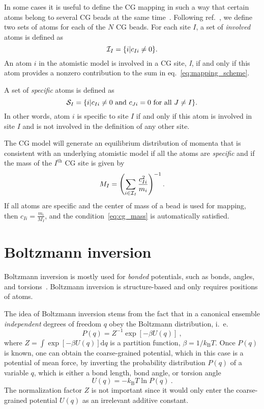 In some cases it is useful to define the CG mapping in such a way that certain atoms belong to several CG beads at the same time~\cite{Fritz:2009}. Following ref.~\cite{Noid:2008.1}, we define two sets of atoms for each of the $N$ CG beads. For each site $I$, a set of {\em involved} atoms is defined as
\begin{equation}
 {\cal I}_I=\{i|c_{Ii}\ne0\}.
\end{equation}
An atom $i$ in the atomistic model is involved in a CG site, \textit{I}, if and only if this atom provides a nonzero contribution to the sum in eq.~\ref{eq:mapping_scheme}.

A set of {\em specific} atoms is defined as
\begin{equation}
 {\cal S}_I=\{i|c_{Ii}\ne0 \text{ and } c_{Ji}=0 \text{ for all } J \ne I\}.
\end{equation}
In other words, atom $i$ is specific to site $I$ if and only if this atom is involved in site $I$ and is not involved in the definition of any other site.

The CG model will generate an equilibrium distribution of momenta that is consistent with an underlying atomistic model if all the atoms are {\em specific} and if the mass of the $I^\text{th}$ CG site is given by~\cite{Noid:2008.1}
\begin{equation}
M_I= \left( \sum_{i \in {\cal I}_I}\frac{c_{Ii}^2}{m_i} \right)^{-1}.
\label{eq:cg_mass}
\end{equation}
%
If all atoms are specific and the center of mass of a bead is used for mapping, then $c_{Ii} = \frac{m_i}{M_I}$, and the condition~\ref{eq:cg_mass} is automatically satisfied.

\section{Boltzmann inversion}
\label{sec:bi}

Boltzmann inversion is mostly used for {\em bonded} potentials, such as bonds, angles, and torsions~\cite{Tschoep:1998}. Boltzmann inversion is structure-based and only requires positions of atoms.

The idea of Boltzmann inversion stems from the fact that in a canonical ensemble {\em independent} degrees of freedom $q$ obey the Boltzmann distribution, i.~e.
%
\begin{equation}
  P(q) = Z^{-1} \exp\left[ - \beta U(q) \right]~,
  \label{eq:boltzmann}
\end{equation}
%
where \mbox{$Z = \int \exp \left[ - \beta U(q) \right] \text{d}q $} is a partition function, \mbox{$\beta = 1/k_\text{B} T$}.
%
Once $P(q)$ is known, one can obtain the coarse-grained potential, which in this case is a potential of mean force, by inverting the probability distribution $P(q)$ of a variable $q$, which is either a bond length, bond angle, or torsion angle
\begin{equation}
  U(q) = - k_\text{B} T \ln  P(q) ~.
  \label{eq:inv_boltzmann}
\end{equation}
%
The normalization factor $Z$ is not important since it would only enter the coarse-grained potential $U(q)$ as an irrelevant additive constant.

